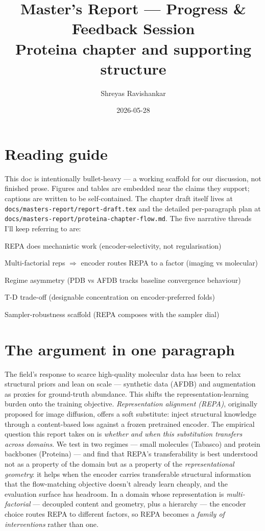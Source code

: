 \documentclass[11pt,a4paper]{article}
\title{Master's Report --- Progress \& Feedback Session\\\large Proteina chapter and supporting structure}
\author{Shreyas Ravishankar}
\date{2026-05-28}
\begin{document}
\maketitle

\section*{Reading guide}

This doc is intentionally bullet-heavy --- a working scaffold for our
discussion, not finished prose. Figures and tables are embedded near the
claims they support; captions are written to be self-contained. The
chapter draft itself lives at \texttt{docs/masters-report/report-draft.tex}
and the detailed per-paragraph plan at
\texttt{docs/masters-report/proteina-chapter-flow.md}. The five narrative
threads I'll keep referring to are:
\begin{description}[leftmargin=*,itemsep=0pt]
\item[T1] REPA does mechanistic work (encoder-selectivity, not regularisation)
\item[T2] Multi-factorial reps $\Rightarrow$ encoder routes REPA to a factor (imaging vs molecular)
\item[T3] Regime asymmetry (PDB vs AFDB tracks baseline convergence behaviour)
\item[T4] T-D trade-off (designable concentration on encoder-preferred folds)
\item[T5] Sampler-robustness scaffold (REPA composes with the sampler dial)
\end{description}

\section{The argument in one paragraph}

The field's response to scarce high-quality molecular data has been to
relax structural priors and lean on scale --- synthetic data (AFDB) and
augmentation as proxies for ground-truth abundance. This shifts the
representation-learning burden onto the training objective. \emph{Representation
alignment (REPA)}, originally proposed for image diffusion, offers a soft
substitute: inject structural knowledge through a content-based loss
against a frozen pretrained encoder. The empirical question this report
takes on is \emph{whether and when this substitution transfers across
domains}. We test in two regimes --- small molecules (Tabasco) and protein
backbones (Proteina) --- and find that REPA's transferability is best
understood not as a property of the domain but as a property of the
\emph{representational geometry}: it helps when the encoder carries
transferable structural information that the flow-matching objective
doesn't already learn cheaply, and the evaluation surface has headroom.
In a domain whose representation is \emph{multi-factorial} --- decoupled
content and geometry, plus a hierarchy --- the encoder choice routes REPA
to different factors, so REPA becomes a \emph{family of interventions}
rather than one.
\end{document}
